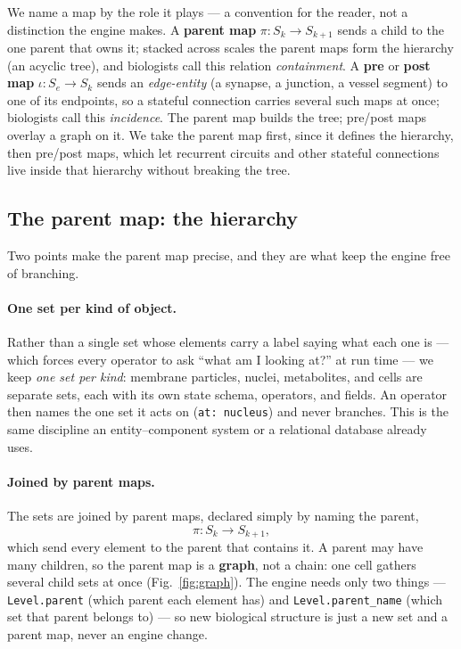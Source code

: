 \documentclass[11pt]{article}
\newcommand{\code}[1]{\texttt{#1}}
\begin{document}
We name a map by the role it plays --- a convention for the reader, not a distinction
the engine makes. A \textbf{parent map} $\pi:S_k\to S_{k+1}$ sends a child to the one
parent that owns it; stacked across scales the parent maps form the hierarchy (an
acyclic tree), and biologists call this relation \emph{containment}. A \textbf{pre}
or \textbf{post map} $\iota:S_e\to S_k$ sends an \emph{edge-entity} (a synapse, a
junction, a vessel segment) to one of its endpoints, so a stateful connection carries
several such maps at once; biologists call this \emph{incidence}. The parent map
builds the tree; pre/post maps overlay a graph on it. We take the parent map first,
since it defines the hierarchy, then pre/post maps, which let recurrent circuits and
other stateful connections live inside that hierarchy without breaking the tree.

\subsection*{The parent map: the hierarchy}

Two points make the parent map precise, and they are what keep the engine free of
branching.

\paragraph{One set per kind of object.} Rather than a single set whose elements
carry a label saying what each one is --- which forces every operator to ask
``what am I looking at?'' at run time --- we keep \emph{one set per kind}: membrane
particles, nuclei, metabolites, and cells are separate sets, each with its own
state schema, operators, and fields. An operator then names the one set it acts on
(\code{at: nucleus}) and never branches. This is the same discipline an
entity--component system or a relational database already uses.

\paragraph{Joined by parent maps.} The sets are joined by parent maps, declared
simply by naming the parent,
\[
  \pi : S_k \longrightarrow S_{k+1},
\]
which send every element to the parent that contains it. A parent may have many
children, so the parent map is a \textbf{graph}, not a chain: one cell gathers several
child sets at once (Fig.~\ref{fig:graph}). The engine needs only two things ---
\code{Level.parent} (which parent each element has) and \code{Level.parent\_name}
(which set that parent belongs to) --- so new biological structure is just a new
set and a parent map, never an engine change.
\end{document}
